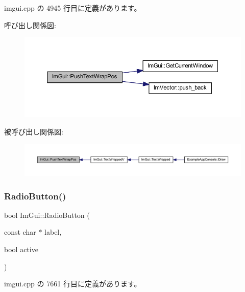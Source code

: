  imgui.\+cpp の 4945 行目に定義があります。

呼び出し関係図\+:\nopagebreak
\begin{figure}[H]
\begin{center}
\leavevmode
\includegraphics[width=350pt]{namespace_im_gui_ab3b203dc94e7ee61a524609b3f3be50a_cgraph}
\end{center}
\end{figure}
被呼び出し関係図\+:\nopagebreak
\begin{figure}[H]
\begin{center}
\leavevmode
\includegraphics[width=350pt]{namespace_im_gui_ab3b203dc94e7ee61a524609b3f3be50a_icgraph}
\end{center}
\end{figure}
\mbox{\label{namespace_im_gui_a6b146763845cbad5a4144772279631bc}} 
\subsubsection{\texorpdfstring{Radio\+Button()}{RadioButton()}\hspace{0.1cm}{\footnotesize\ttfamily [1/2]}}
{\footnotesize\ttfamily bool Im\+Gui\+::\+Radio\+Button (\begin{DoxyParamCaption}\item[{const char $\ast$}]{label,  }\item[{bool}]{active }\end{DoxyParamCaption})}



 imgui.\+cpp の 7661 行目に定義があります。

